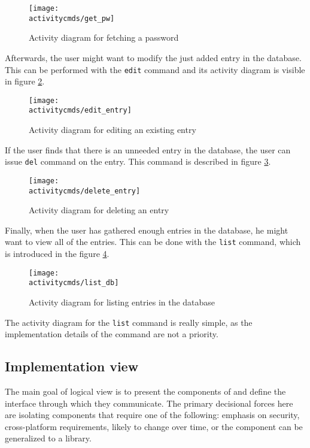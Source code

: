 \begin{figure}[H]
    \centering
    \centerline{\texttt{[image: \\activitycmds/get\_pw]}}
    \caption{Activity diagram for fetching a password}
    \label{dia:get_pw}
\end{figure}

Afterwards, the user might want to modify the just added entry in the database.
This can be performed with the \texttt{edit} command and its activity diagram
is visible in figure \ref{dia:edit_entry}.

\begin{figure}[H]
    \centering
    \centerline{\texttt{[image: \\activitycmds/edit\_entry]}}
    \caption{Activity diagram for editing an existing entry}
    \label{dia:edit_entry}
\end{figure}

If the user finds that there is an unneeded entry in the database, the user can
issue \texttt{del} command on the entry. This command is described in figure
\ref{dia:delete_entry}.

\begin{figure}[H]
    \centering
    \centerline{\texttt{[image: \\activitycmds/delete\_entry]}}
    \caption{Activity diagram for deleting an entry}
    \label{dia:delete_entry}
\end{figure}

Finally, when the user has gathered enough entries in the database, he might
want to view all of the entries. This can be done with the \texttt{list} command,
which is introduced in the figure \ref{dia:list_db}.

\begin{figure}[H]
    \centering
    \centerline{\texttt{[image: \\activitycmds/list\_db]}}
    \caption{Activity diagram for listing entries in the database}
    \label{dia:list_db}
\end{figure}

The activity diagram for the \texttt{list} command is really simple, as the
implementation details of the command are not a priority.

\subsection{Implementation view}

The main goal of logical view is to present the components of \pman and define
the interface through which they communicate. The primary decisional forces
here are isolating components that require one of the following: emphasis on
security, cross-platform requirements, likely to change over time, or the
component can be generalized to a library.

